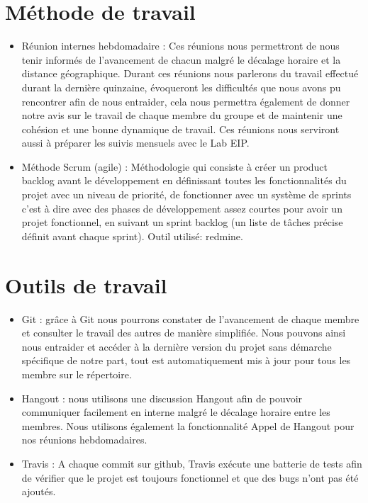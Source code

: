 \section{Méthode de travail}
\begin{itemize}
\item Réunion internes hebdomadaire : Ces réunions nous permettront de nous tenir informés de l’avancement de chacun malgré le décalage horaire et la distance géographique. Durant ces réunions nous parlerons du travail effectué durant la dernière quinzaine, évoqueront les difficultés que nous avons pu rencontrer afin de nous entraider, cela nous permettra également de donner notre avis sur le travail de chaque membre du groupe et de maintenir une cohésion et une bonne dynamique de travail. Ces réunions nous serviront aussi à préparer les suivis mensuels avec le Lab EIP.\\
\item Méthode Scrum (agile) : Méthodologie qui consiste à créer un product backlog avant le développement en définissant toutes les fonctionnalités du projet avec un niveau de priorité, de fonctionner avec un système de sprints c’est à dire avec des phases de développement assez courtes pour avoir un projet fonctionnel, en suivant un sprint backlog (un liste de tâches précise définit avant chaque sprint). Outil utilisé: redmine.\\
\end{itemize}
\section{Outils de travail}
\begin{itemize}
\item Git : grâce à Git nous pourrons constater de l’avancement de chaque membre et consulter le travail des autres de manière simplifiée. Nous pouvons ainsi nous entraider et accéder à la dernière version du projet sans démarche spécifique de notre part, tout est automatiquement mis à jour pour tous les membre sur le répertoire.\\
\item Hangout : nous utilisons une discussion Hangout afin de pouvoir communiquer facilement en interne malgré le décalage horaire entre les membres. Nous utilisons également la fonctionnalité Appel de Hangout pour nos réunions hebdomadaires.\\
\item Travis : A chaque commit sur github, Travis exécute une batterie de tests afin de vérifier que le projet est toujours fonctionnel et que des bugs n’ont pas été ajoutés.\\
\end{itemize}
